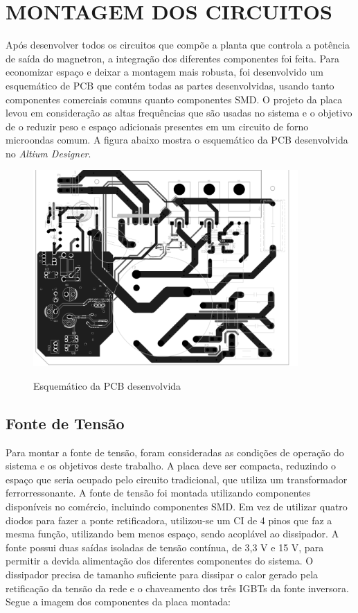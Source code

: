 \section{MONTAGEM DOS CIRCUITOS}
\label{sec:montagem}
Após desenvolver todos os circuitos que compõe a planta que controla a potência de saída do magnetron, a integração dos diferentes componentes foi feita. Para economizar espaço e deixar a montagem mais robusta, foi desenvolvido um esquemático de PCB que contém todas as partes desenvolvidas, usando tanto componentes comerciais comuns quanto componentes SMD. O projeto da placa levou em consideração as altas frequências que são usadas no sistema e o objetivo de o reduzir peso e espaço adicionais presentes em um circuito de forno microondas comum. A figura abaixo mostra o esquemático da PCB desenvolvida no \textit{Altium Designer}.

\begin{figure}[H]
    \centering
    \caption{Esquemático da PCB desenvolvida}
    \includegraphics[width=0.9\textwidth]{./dados/figuras/proj-pcb}
    \label{fig:figura-montagem}
\end{figure}

\subsection{Fonte de Tensão}
Para montar a fonte de tensão, foram consideradas as condições de operação do sistema e os objetivos deste trabalho. A placa deve ser compacta, reduzindo o espaço que seria ocupado pelo circuito tradicional, que utiliza um transformador ferrorressonante. A fonte de tensão foi montada utilizando componentes disponíveis no comércio, incluindo componentes SMD. Em vez de utilizar quatro diodos para fazer a ponte retificadora, utilizou-se um CI de 4 pinos que faz a mesma função, utilizando bem menos espaço, sendo acoplável ao dissipador.  A fonte possui duas saídas isoladas de tensão contínua, de 3,3 V e 15 V, para permitir a devida alimentação dos diferentes componentes do sistema. O dissipador precisa de tamanho suficiente para dissipar o calor gerado pela retificação da tensão da rede e o chaveamento dos três IGBTs da fonte inversora. Segue a imagem dos componentes da placa montada:


